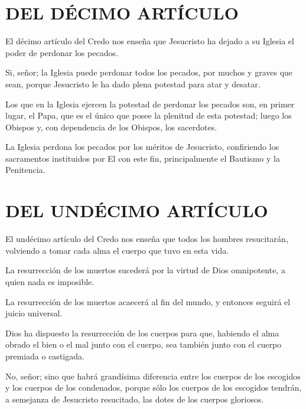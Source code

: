 \section{DEL DÉCIMO ARTÍCULO}

 El décimo artículo del Credo nos enseña que Jesucristo ha dejado
a su Iglesia el poder de perdonar los pecados.

 Si, señor; la Iglesia
puede perdonar todos los pecados, por muchos y graves que sean, porque
Jesucristo le ha dado plena potestad para atar y desatar.

 Los que en la Iglesia ejercen la potestad de perdonar los pecados
son, en primer lugar, el Papa, que es el único que posee la plenitud de esta
potestad; luego los Obispos y, con dependencia de los Obispos, los sacerdotes.

 La Iglesia perdona los pecados
por los méritos de Jesucristo, confiriendo los sacramentos instituidos por El con
este fin, principalmente el Bautismo y la Penitencia.

\section{DEL UNDÉCIMO ARTÍCULO}

 El undécimo artículo del Credo nos enseña que todos los
hombres resucitarán, volviendo a tomar cada alma el cuerpo que tuvo en esta
vida.

 La resurrección de los
muertos sucederá por la virtud de Dios omnipotente, a quien nada es imposible.

 La resurrección de
los muertos acaecerá al fin del mundo, y entonces seguirá el juicio universal.

 Dios ha
dispuesto la resurrección de los cuerpos para que, habiendo el alma obrado el bien
o el mal junto con el cuerpo, sea también junto con el cuerpo premiada o
castigada.

 No, señor; sino
que habrá grandísima diferencia entre los cuerpos de los escogidos y los cuerpos
de los condenados, porque sólo los cuerpos de los escogidos tendrán, a semejanza
de Jesucristo resucitado, las dotes de los cuerpos gloriosos.

